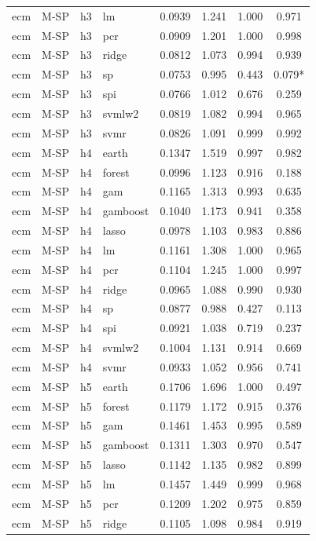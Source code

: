 \begin{ThreePartTable}
\begin{longtable}[t]{llclcccc}
ecm & M-SP & h3 & lm & 0.0939 & 1.241 & 1.000 & 0.971\\
ecm & M-SP & h3 & pcr & 0.0909 & 1.201 & 1.000 & 0.998\\
ecm & M-SP & h3 & ridge & 0.0812 & 1.073 & 0.994 & 0.939\\
ecm & M-SP & h3 & sp & 0.0753 & 0.995 & 0.443 & 0.079*\\
ecm & M-SP & h3 & spi & 0.0766 & 1.012 & 0.676 & 0.259\\
ecm & M-SP & h3 & svmlw2 & 0.0819 & 1.082 & 0.994 & 0.965\\
ecm & M-SP & h3 & svmr & 0.0826 & 1.091 & 0.999 & 0.992\\
\addlinespace
ecm & M-SP & h4 & earth & 0.1347 & 1.519 & 0.997 & 0.982\\
ecm & M-SP & h4 & forest & 0.0996 & 1.123 & 0.916 & 0.188\\
ecm & M-SP & h4 & gam & 0.1165 & 1.313 & 0.993 & 0.635\\
ecm & M-SP & h4 & gamboost & 0.1040 & 1.173 & 0.941 & 0.358\\
ecm & M-SP & h4 & lasso & 0.0978 & 1.103 & 0.983 & 0.886\\
ecm & M-SP & h4 & lm & 0.1161 & 1.308 & 1.000 & 0.965\\
ecm & M-SP & h4 & pcr & 0.1104 & 1.245 & 1.000 & 0.997\\
ecm & M-SP & h4 & ridge & 0.0965 & 1.088 & 0.990 & 0.930\\
ecm & M-SP & h4 & sp & 0.0877 & 0.988 & 0.427 & 0.113\\
ecm & M-SP & h4 & spi & 0.0921 & 1.038 & 0.719 & 0.237\\
ecm & M-SP & h4 & svmlw2 & 0.1004 & 1.131 & 0.914 & 0.669\\
ecm & M-SP & h4 & svmr & 0.0933 & 1.052 & 0.956 & 0.741\\
\addlinespace
ecm & M-SP & h5 & earth & 0.1706 & 1.696 & 1.000 & 0.497\\
ecm & M-SP & h5 & forest & 0.1179 & 1.172 & 0.915 & 0.376\\
ecm & M-SP & h5 & gam & 0.1461 & 1.453 & 0.995 & 0.589\\
ecm & M-SP & h5 & gamboost & 0.1311 & 1.303 & 0.970 & 0.547\\
ecm & M-SP & h5 & lasso & 0.1142 & 1.135 & 0.982 & 0.899\\
ecm & M-SP & h5 & lm & 0.1457 & 1.449 & 0.999 & 0.968\\
ecm & M-SP & h5 & pcr & 0.1209 & 1.202 & 0.975 & 0.859\\
ecm & M-SP & h5 & ridge & 0.1105 & 1.098 & 0.984 & 0.919\\

\end{longtable}
\end{ThreePartTable}
